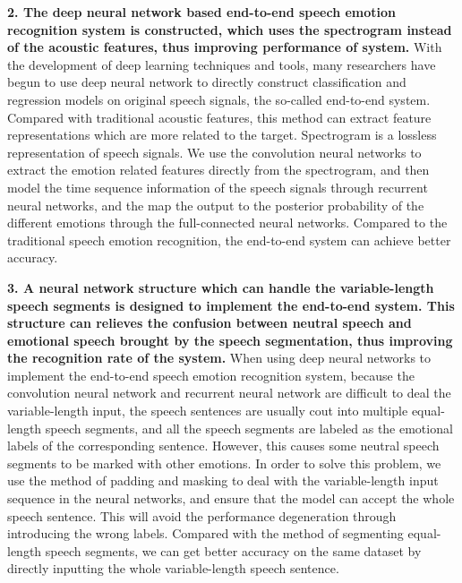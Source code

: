 \begin{eabstract}
\textbf{2. The deep neural network based end-to-end speech emotion recognition system is constructed, which uses the spectrogram instead of the acoustic features, thus improving performance of system.}  With the development of deep learning techniques and tools, many researchers have begun to use deep neural network to directly construct classification and regression models on original speech signals, the so-called end-to-end system. Compared with traditional acoustic features, this method can extract feature representations which are more related to the target. Spectrogram is a lossless representation of speech signals. We use the convolution neural networks to extract the emotion related features directly from the spectrogram,  and then model the time sequence information of the speech signals through recurrent neural networks, and the map the output to the posterior probability of the different emotions through the full-connected neural networks. Compared to the traditional speech emotion recognition, the end-to-end system can achieve better accuracy.

\textbf{3. A neural network structure which can handle the variable-length speech segments is designed to implement the end-to-end system. This structure can relieves the confusion between neutral speech and emotional speech brought by the speech segmentation, thus improving the recognition rate of the system.} When using deep neural networks to implement the end-to-end speech emotion recognition system, because the convolution neural network and recurrent neural network are difficult to deal the variable-length input, the speech sentences are usually cout into multiple equal-length speech segments, and all the speech segments are labeled as the emotional labels of the corresponding sentence. However, this causes some neutral speech segments to be marked with other emotions. In order to solve this problem, we use the method of padding and masking to deal with the variable-length input sequence in the neural networks, and ensure that the model can accept the whole speech sentence. This will avoid the performance degeneration through introducing the wrong labels. Compared with the method of segmenting equal-length speech segments, we can get better accuracy on the same dataset by directly inputting the whole variable-length speech sentence.
\end{eabstract}

